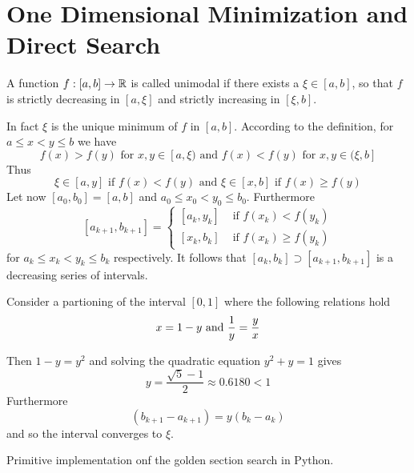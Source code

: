 
\newpage
\section{One Dimensional Minimization and Direct Search}


\begin{definition}\label{def:unimodal_fnc}
A function \( f : [a,b] \to \mathbb{R} \) is called unimodal if there exists a \( \xi \in [a,b] \), so that
\( f \) is strictly decreasing in \( [a, \xi] \) and strictly increasing in \( [\xi, b] \).
\end{definition}
\bigskip

In fact \( \xi \) is the unique minimum of \( f \) in \( [a, b] \). According to the definition, 
for \( a \le x < y \le b \) we have 
\[
    f(x) > f(y) \text{ for } x, y \in [a, \xi) \text{ and } f(x) < f(y) \text{ for }  x, y \in (\xi, b]
\]
Thus
\[
    \xi \in [a, y] \text{ if } f(x) < f(y) \text{ and } \xi \in [x, b] \text{ if } f(x) \ge f(y)
\]
Let now \( [a_0, b_0] = [a, b] \) and \(a_0 \le x_0 < y_0 \le b_0 \). Furthermore
\[  
    [a_{k + 1}, b_{k + 1}] = 
        \begin{cases}
            [a_k, y_k] & \text{ if } f(x_k) < f(y_k)  \\
            [x_k, b_k] & \text{ if } f(x_k) \ge f(y_k)
        \end{cases}
\]
for \( a_k \le x_k < y_k \le b_k \) respectively. It follows that \( [a_k, b_k] \supset [a_{k + 1}, b_{k + 1}] \) 
is a decreasing series of intervals.

Consider a partioning of the interval \( [0, 1] \) where the following relations hold 
\[
     x = 1 - y \text{ and } \\ \frac{1}{y} = \frac{y}{x}
\]

Then \( 1 - y = y^2 \) and solving the quadratic equation \( y^2 + y = 1 \) gives
\[ 
     y = \frac{\sqrt{5} - 1}{2} \approx 0.6180 < 1
\]
Furthermore
\[  
    (b_{k + 1} - a_{k + 1}) =  y(b_k - a_k)
\]
and so the interval converges to \( \xi \).
\bigskip


\begin{algorithm}\label{algo:golden_section_search}
Primitive implementation onf the golden section search in Python.
\hfill\bigskip
\end{algorithm}
\inputminted[fontsize=\small, framesep=0.35cm, frame=lines, python3=true]{python}{golden_section.py}
\bigskip



